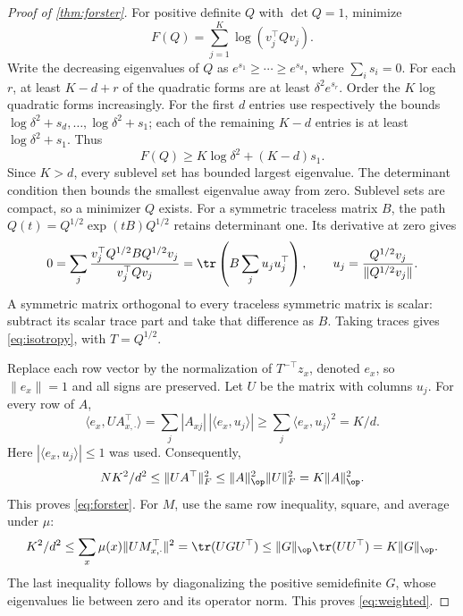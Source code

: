 \begin{proof}[Proof of \cref{thm:forster}]
For positive definite $Q$ with $\det Q=1$, minimize
\[
 F(Q)=\sum_{j=1}^K\log(v_j^\top Qv_j).
\]
Write the decreasing eigenvalues of $Q$ as $e^{s_1}\geq\cdots\geq e^{s_d}$, where $\sum_i s_i=0$. For each $r$, at least $K-d+r$ of the quadratic forms are at least $\delta^2e^{s_r}$. Order the $K$ log quadratic forms increasingly. For the first $d$ entries use respectively the bounds
$\log\delta^2+s_d,\ldots,\log\delta^2+s_1$; each of the remaining $K-d$ entries is at least $\log\delta^2+s_1$. Thus
\[
 F(Q)\geq K\log\delta^2+(K-d)s_1.
\]
Since $K>d$, every sublevel set has bounded largest eigenvalue. The determinant condition then bounds the smallest eigenvalue away from zero. Sublevel sets are compact, so a minimizer $Q$ exists.
For a symmetric traceless matrix $B$, the path
$Q(t)=Q^{1/2}\exp(tB)Q^{1/2}$ retains determinant one. Its derivative at zero gives
\[
 0=\sum_j\frac{v_j^\top Q^{1/2}BQ^{1/2}v_j}{v_j^\top Qv_j}
   =\tr\left(B\sum_j u_ju_j^\top\right),
 \qquad u_j=\frac{Q^{1/2}v_j}{\|Q^{1/2}v_j\|}.
\]
A symmetric matrix orthogonal to every traceless symmetric matrix is scalar: subtract its scalar trace part and take that difference as $B$. Taking traces gives \eqref{eq:isotropy}, with $T=Q^{1/2}$.

Replace each row vector by the normalization of $T^{-\top}z_x$, denoted $e_x$, so $\|e_x\|=1$ and all signs are preserved. Let $U$ be the matrix with columns $u_j$. For every row of $A$,
\[
 \langle e_x,UA_{x,\cdot}^{\top}\rangle
 =\sum_j |A_{xj}|\,|\langle e_x,u_j\rangle|
 \geq\sum_j\langle e_x,u_j\rangle^2=K/d.
\]
Here $|\langle e_x,u_j\rangle|\leq1$ was used. Consequently,
\[
 NK^2/d^2\leq\|UA^\top\|_F^2
 \leq\|A\|_\op^2\|U\|_F^2=K\|A\|_\op^2.
\]
This proves \eqref{eq:forster}. For $M$, use the same row inequality, square, and average under $\mu$:
\[
 K^2/d^2\leq\sum_x\mu(x)\|UM_{x,\cdot}^{\top}\|^2
 =\tr(UGU^\top)\leq\|G\|_\op\tr(UU^\top)=K\|G\|_\op.
\]
The last inequality follows by diagonalizing the positive semidefinite $G$, whose eigenvalues lie between zero and its operator norm. This proves \eqref{eq:weighted}.
\end{proof}
